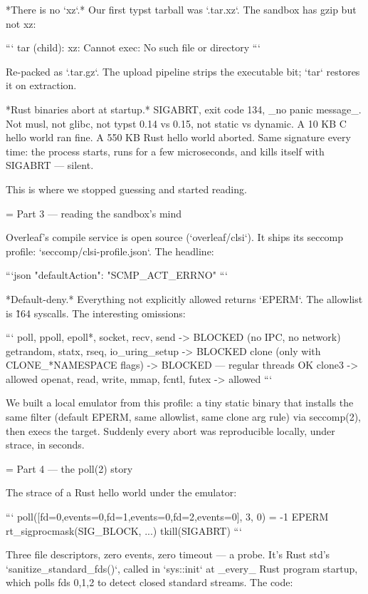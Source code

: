 *There is no `xz`.* Our first typst tarball was `.tar.xz`. The sandbox has
gzip but not xz:

```
tar (child): xz: Cannot exec: No such file or directory
```

Re-packed as `.tar.gz`. The upload pipeline strips the executable bit; `tar`
restores it on extraction.

*Rust binaries abort at startup.* SIGABRT, exit code 134, _no panic
message_. Not musl, not glibc, not typst 0.14 vs 0.15, not static vs dynamic.
A 10 KB C hello world ran fine. A 550 KB Rust hello world aborted. Same
signature every time: the process starts, runs for a few microseconds, and
kills itself with SIGABRT — silent.

This is where we stopped guessing and started reading.

= Part 3 — reading the sandbox's mind

Overleaf's compile service is open source (`overleaf/clsi`). It ships its
seccomp profile: `seccomp/clsi-profile.json`. The headline:

```json
"defaultAction": "SCMP_ACT_ERRNO"
```

*Default-deny.* Everything not explicitly allowed returns `EPERM`. The
allowlist is \~164 syscalls. The interesting omissions:

```
poll, ppoll, epoll*, socket, recv, send  -> BLOCKED (no IPC, no network)
getrandom, statx, rseq, io_uring_setup   -> BLOCKED
clone (only with CLONE_*NAMESPACE flags) -> BLOCKED  — regular threads OK
clone3                                   -> allowed
openat, read, write, mmap, fcntl, futex   -> allowed
```

We built a local emulator from this profile: a tiny static binary that
installs the same filter (default EPERM, same allowlist, same clone arg rule)
via seccomp(2), then execs the target. Suddenly every abort was reproducible
locally, under strace, in seconds.

= Part 4 — the poll(2) story

The strace of a Rust hello world under the emulator:

```
poll([{fd=0,events=0},{fd=1,events=0},{fd=2,events=0}], 3, 0) = -1 EPERM
rt_sigprocmask(SIG_BLOCK, ...)
tkill(SIGABRT)
```

Three file descriptors, zero events, zero timeout — a probe. It's Rust std's
`sanitize_standard_fds()`, called in `sys::init` at _every_ Rust program
startup, which polls fds 0,1,2 to detect closed standard streams. The code:

